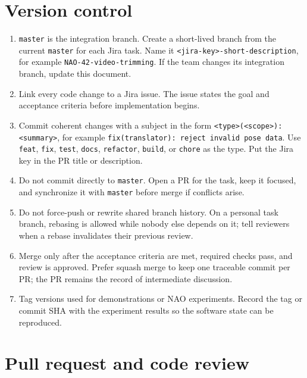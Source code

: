 \documentclass[12pt,a4paper]{article}
\begin{document}
\section{Version control}

\begin{enumerate}

\item \texttt{master} is the integration branch. Create a short-lived branch from the current \texttt{master} for each Jira task. Name it \texttt{\textless{}jira-key\textgreater{}-short-description}, for example \texttt{NAO-42-video-trimming}. If the team changes its integration branch, update this document.

\item Link every code change to a Jira issue. The issue states the goal and acceptance criteria before implementation begins.

\item Commit coherent changes with a subject in the form \texttt{\textless{}type\textgreater{}(\textless{}scope\textgreater{}): \textless{}summary\textgreater{}}, for example \texttt{fix(translator): reject invalid pose data}. Use \texttt{feat}, \texttt{fix}, \texttt{test}, \texttt{docs}, \texttt{refactor}, \texttt{build}, or \texttt{chore} as the type. Put the Jira key in the PR title or description.

\item Do not commit directly to \texttt{master}. Open a PR for the task, keep it focused, and synchronize it with \texttt{master} before merge if conflicts arise.

\item Do not force-push or rewrite shared branch history. On a personal task branch, rebasing is allowed while nobody else depends on it; tell reviewers when a rebase invalidates their previous review.

\item Merge only after the acceptance criteria are met, required checks pass, and review is approved. Prefer squash merge to keep one traceable commit per PR; the PR remains the record of intermediate discussion.

\item Tag versions used for demonstrations or NAO experiments. Record the tag or commit SHA with the experiment results so the software state can be reproduced.

\end{enumerate}

\section{Pull request and code review}
\end{document}

